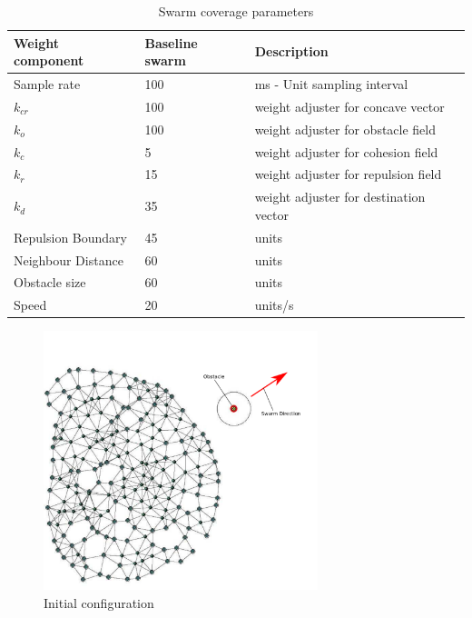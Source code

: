 \documentclass[preprint,12pt]{elsarticle}
\begin{document}
\begin{table}
\caption{Swarm coverage parameters}
\label{tab:SwarmCoverageParameters}
\begin{center}
\begin{tabular}{| p{1.3cm} | p{1.3cm} | p{3.5cm} |}
\hline
\bf Weight \bf component & \bf Baseline \bf swarm & \bf Description \\ \hline
Sample rate & 100 & ms - Unit sampling interval\\  \hline
$k_{cr}$ & 100 & weight adjuster for concave vector\\  \hline
$k_o$ & 100 & weight adjuster for obstacle field\\  \hline
$k_c$ & 5 & weight adjuster for cohesion field\\  \hline
$k_r$ & 15 & weight adjuster for repulsion  field\\  \hline
$k_d$ & 35 & weight adjuster for destination vector\\  \hline
Repulsion Boundary & 45 & units\\  \hline
Neighbour Distance & 60 & units\\  \hline
Obstacle size & 60 & units\\  \hline
Speed & 20 & units/s\\  \hline
\end{tabular}
\end{center}
\end{table}

\begin{figure}
\begin{center}
\includegraphics[width=8cm]{figures/ObstacleTest}
\end{center}
\caption{Initial configuration\label{voids:ObstacleTest1}}
\end{figure}
\end{document}
